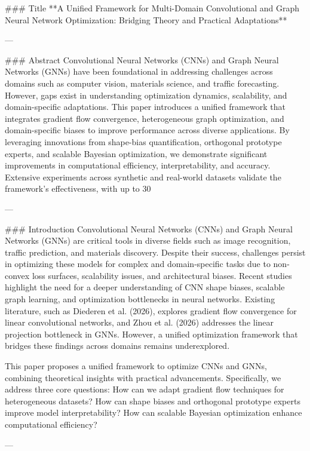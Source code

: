 ### Title  
**A Unified Framework for Multi-Domain Convolutional and Graph Neural Network Optimization: Bridging Theory and Practical Adaptations**

---

### Abstract  
Convolutional Neural Networks (CNNs) and Graph Neural Networks (GNNs) have been foundational in addressing challenges across domains such as computer vision, materials science, and traffic forecasting. However, gaps exist in understanding optimization dynamics, scalability, and domain-specific adaptations. This paper introduces a unified framework that integrates gradient flow convergence, heterogeneous graph optimization, and domain-specific biases to improve performance across diverse applications. By leveraging innovations from shape-bias quantification, orthogonal prototype experts, and scalable Bayesian optimization, we demonstrate significant improvements in computational efficiency, interpretability, and accuracy. Extensive experiments across synthetic and real-world datasets validate the framework's effectiveness, with up to 30%

---

### Introduction  
Convolutional Neural Networks (CNNs) and Graph Neural Networks (GNNs) are critical tools in diverse fields such as image recognition, traffic prediction, and materials discovery. Despite their success, challenges persist in optimizing these models for complex and domain-specific tasks due to non-convex loss surfaces, scalability issues, and architectural biases. Recent studies highlight the need for a deeper understanding of CNN shape biases, scalable graph learning, and optimization bottlenecks in neural networks. Existing literature, such as Diederen et al. (2026), explores gradient flow convergence for linear convolutional networks, and Zhou et al. (2026) addresses the linear projection bottleneck in GNNs. However, a unified optimization framework that bridges these findings across domains remains underexplored.

This paper proposes a unified framework to optimize CNNs and GNNs, combining theoretical insights with practical advancements. Specifically, we address three core questions: How can we adapt gradient flow techniques for heterogeneous datasets? How can shape biases and orthogonal prototype experts improve model interpretability? How can scalable Bayesian optimization enhance computational efficiency?

---

